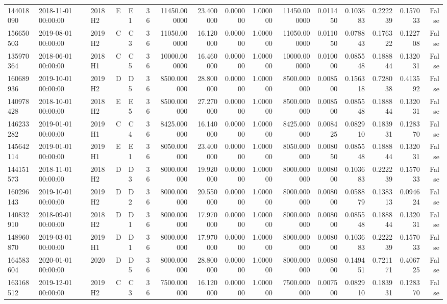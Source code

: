 \begin{tabular}{lllllrrrrrrrrrrr}
144018090 & 2018-11-01 00:00:00 & 2018H2 & E & E1 & 36 & 11450.000000 & 23.400000 & 0.000000 & 1.000000 & 11450.000000 & 0.011450 & 0.103683 & 0.222239 & 0.157033 & False \\
156650503 & 2019-08-01 00:00:00 & 2019H2 & C & C3 & 36 & 11050.000000 & 16.120000 & 0.000000 & 1.000000 & 11050.000000 & 0.011050 & 0.078843 & 0.176322 & 0.122708 & False \\
135970364 & 2018-06-01 00:00:00 & 2018H1 & C & C5 & 36 & 10000.000000 & 16.460000 & 0.000000 & 1.000000 & 10000.000000 & 0.010000 & 0.085548 & 0.188844 & 0.132031 & False \\
160689936 & 2019-10-01 00:00:00 & 2019H2 & D & D5 & 36 & 8500.000000 & 28.800000 & 0.000000 & 1.000000 & 8500.000000 & 0.008500 & 0.156318 & 0.728038 & 0.413592 & False \\
140978428 & 2018-10-01 00:00:00 & 2018H2 & E & E5 & 36 & 8500.000000 & 27.270000 & 0.000000 & 1.000000 & 8500.000000 & 0.008500 & 0.085548 & 0.188844 & 0.132031 & False \\
146233282 & 2019-01-01 00:00:00 & 2019H1 & C & C4 & 36 & 8425.000000 & 16.140000 & 0.000000 & 1.000000 & 8425.000000 & 0.008425 & 0.082910 & 0.183931 & 0.128370 & False \\
145642114 & 2019-01-01 00:00:00 & 2019H1 & E & E1 & 36 & 8050.000000 & 23.400000 & 0.000000 & 1.000000 & 8050.000000 & 0.008050 & 0.085548 & 0.188844 & 0.132031 & False \\
144151573 & 2018-11-01 00:00:00 & 2018H2 & D & D3 & 36 & 8000.000000 & 19.920000 & 0.000000 & 1.000000 & 8000.000000 & 0.008000 & 0.103683 & 0.222239 & 0.157033 & False \\
160296143 & 2019-10-01 00:00:00 & 2019H2 & D & D2 & 36 & 8000.000000 & 20.550000 & 0.000000 & 1.000000 & 8000.000000 & 0.008000 & 0.058879 & 0.138313 & 0.094624 & False \\
140832910 & 2018-09-01 00:00:00 & 2018H2 & D & D1 & 36 & 8000.000000 & 17.970000 & 0.000000 & 1.000000 & 8000.000000 & 0.008000 & 0.085548 & 0.188844 & 0.132031 & False \\
148960870 & 2019-03-01 00:00:00 & 2019H1 & D & D1 & 36 & 8000.000000 & 17.970000 & 0.000000 & 1.000000 & 8000.000000 & 0.008000 & 0.103683 & 0.222239 & 0.157033 & False \\
164583604 & 2020-01-01 00:00:00 & 2020 & D & D5 & 36 & 8000.000000 & 28.800000 & 0.000000 & 1.000000 & 8000.000000 & 0.008000 & 0.149451 & 0.721171 & 0.406725 & False \\
163168512 & 2019-12-01 00:00:00 & 2019H2 & C & C3 & 36 & 7500.000000 & 16.120000 & 0.000000 & 1.000000 & 7500.000000 & 0.007500 & 0.082910 & 0.183931 & 0.128370 & False \\

\end{tabular}
